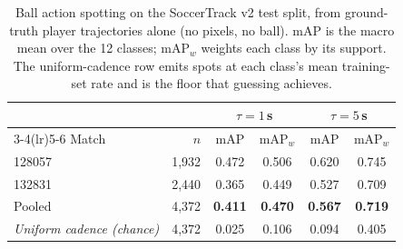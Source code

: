 \begin{table}[t]
  \centering
  \caption{Ball action spotting on the SoccerTrack v2 test split, from ground-truth player trajectories alone (no pixels, no ball). $\text{mAP}$ is the macro mean over the 12 classes; $\text{mAP}_w$ weights each class by its support. The uniform-cadence row emits spots at each class's mean training-set rate and is the floor that guessing achieves.}
  \label{tab:bas_results}
  \small
  \begin{tabular}{lrcccc}
    \toprule
    & & \multicolumn{2}{c}{$\tau = 1\,$s} & \multicolumn{2}{c}{$\tau = 5\,$s} \\
    \cmidrule(lr){3-4}\cmidrule(lr){5-6}
    Match & $n$ & mAP & mAP$_w$ & mAP & mAP$_w$ \\
    \midrule
    128057 & 1,932 & 0.472 & 0.506 & 0.620 & 0.745 \\
    132831 & 2,440 & 0.365 & 0.449 & 0.527 & 0.709 \\
    \midrule
    Pooled & 4,372 & \textbf{0.411} & \textbf{0.470} & \textbf{0.567} & \textbf{0.719} \\
    \midrule
    \textit{Uniform cadence (chance)} & 4,372 & 0.025 & 0.106 & 0.094 & 0.405 \\
    \bottomrule
  \end{tabular}
\end{table}
